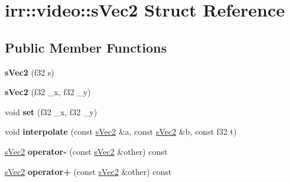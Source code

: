 \hypertarget{structirr_1_1video_1_1s_vec2}{\section{irr\-:\-:video\-:\-:s\-Vec2 Struct Reference}
\label{structirr_1_1video_1_1s_vec2}
}
\subsection*{Public Member Functions}
\begin{DoxyCompactItemize}
\item 
\hypertarget{structirr_1_1video_1_1s_vec2_a11cb855d5bd9721db6b6a4906e6bc911}{{\bfseries s\-Vec2} (f32 s)}\label{structirr_1_1video_1_1s_vec2_a11cb855d5bd9721db6b6a4906e6bc911}

\item 
\hypertarget{structirr_1_1video_1_1s_vec2_afd565a92b4ac0d6c23a9a898f06382d0}{{\bfseries s\-Vec2} (f32 \-\_\-x, f32 \-\_\-y)}\label{structirr_1_1video_1_1s_vec2_afd565a92b4ac0d6c23a9a898f06382d0}

\item 
\hypertarget{structirr_1_1video_1_1s_vec2_a0020374506dff179140f091132596d3c}{void {\bfseries set} (f32 \-\_\-x, f32 \-\_\-y)}\label{structirr_1_1video_1_1s_vec2_a0020374506dff179140f091132596d3c}

\item 
\hypertarget{structirr_1_1video_1_1s_vec2_a96f7fafdc1fd4ac69428b02e5dea6a80}{void {\bfseries interpolate} (const \hyperlink{structirr_1_1video_1_1s_vec2}{s\-Vec2} \&a, const \hyperlink{structirr_1_1video_1_1s_vec2}{s\-Vec2} \&b, const f32 t)}\label{structirr_1_1video_1_1s_vec2_a96f7fafdc1fd4ac69428b02e5dea6a80}

\item 
\hypertarget{structirr_1_1video_1_1s_vec2_a5f6bd429b7263b365b4e579f64b818db}{\hyperlink{structirr_1_1video_1_1s_vec2}{s\-Vec2} {\bfseries operator-\/} (const \hyperlink{structirr_1_1video_1_1s_vec2}{s\-Vec2} \&other) const }\label{structirr_1_1video_1_1s_vec2_a5f6bd429b7263b365b4e579f64b818db}

\item 
\hypertarget{structirr_1_1video_1_1s_vec2_a20349a799e30a2a7f8201703cc368c47}{\hyperlink{structirr_1_1video_1_1s_vec2}{s\-Vec2} {\bfseries operator+} (const \hyperlink{structirr_1_1video_1_1s_vec2}{s\-Vec2} \&other) const }\label{structirr_1_1video_1_1s_vec2_a20349a799e30a2a7f8201703cc368c47}


\end{DoxyCompactItemize}
